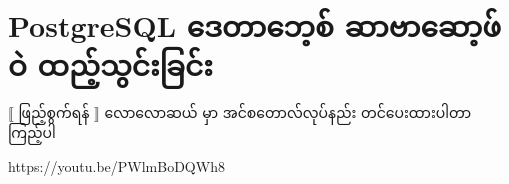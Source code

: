 \chapter{PostgreSQL ဒေတာဘေ့စ် ဆာဗာဆော့ဖ်ဝဲ ထည့်သွင်းခြင်း} \label{apdx3}
$\big\llbracket$ ဖြည့်စွက်ရန် $\big\rrbracket$
\noindent
လောလောဆယ်  မှာ  အင်စတောလ်လုပ်နည်း တင်ပေးထားပါတာ ကြည့်ပါ
\begin{vbtm}
https://youtu.be/PWlmBoDQWh8
\end{vbtm}
